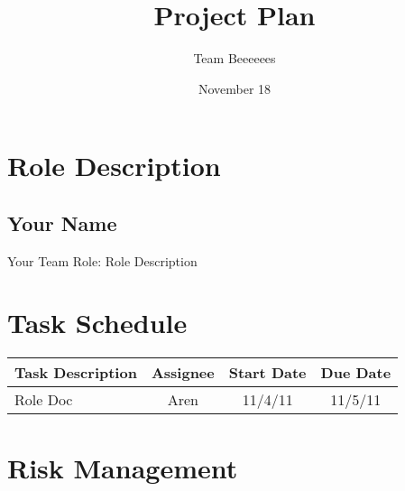 \documentclass[12pt, letterpaper]{article}
\begin{document}
\title{Project Plan}
\author{Team Beeeeees}
\date{November 18}
\maketitle
\section{Role Description}
  \subsection{Your Name}
  Your Team Role: Role Description
\section{Task Schedule}
\begin{center}
  \begin{tabular}{l || c | c | c | }
    Task Description & Assignee & Start Date & Due Date \\
    \hline
    Role Doc & Aren & 11/4/11 & 11/5/11 \\
    \hline
  \end{tabular}
\end{center}

\section{Risk Management}
\end{document}
